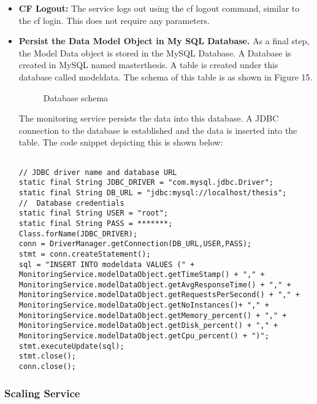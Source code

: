 \documentclass[article,type=msc,colorback,12pt,accentcolor=tud7b,table]{tudthesis}
\begin{document}
\begin{itemize}
\begin{lstlisting}
\end{lstlisting}
		
\item{\textbf{CF Logout:}} The service logs out using the cf logout command, similar to the cf login. This does not require any parameters.
		
\item{\textbf{Persist the Data Model Object in My SQL Database.}} As  a final step, the Model Data object is stored in the MySQL Database. A Database is created in MySQL named masterthesis. A table is created under this database called modeldata. The schema of this table is as shown in Figure 15.

 \begin{figure}[h]
 	\begin{center}
 		\makebox[\textwidth]{\texttt{[image: D5]}}
 	\end{center}
 	\caption{Database schema}
 \end{figure}	

The monitoring service persists the data into this database. A JDBC connection to the database is established and the data is inserted into the table. The code snippet depicting this is shown below:

\begin{lstlisting}

// JDBC driver name and database URL
static final String JDBC_DRIVER = "com.mysql.jdbc.Driver";  
static final String DB_URL = "jdbc:mysql://localhost/thesis";
//  Database credentials
static final String USER = "root";
static final String PASS = *******;
Class.forName(JDBC_DRIVER);
conn = DriverManager.getConnection(DB_URL,USER,PASS);
stmt = conn.createStatement();
sql = "INSERT INTO modeldata VALUES (" + 
MonitoringService.modelDataObject.getTimeStamp() + "," + 
MonitoringService.modelDataObject.getAvgResponseTime() + "," + 
MonitoringService.modelDataObject.getRequestsPerSecond() + "," + 
MonitoringService.modelDataObject.getNoInstances()+ "," + 
MonitoringService.modelDataObject.getMemory_percent() + "," + 
MonitoringService.modelDataObject.getDisk_percent() + "," +
MonitoringService.modelDataObject.getCpu_percent() + ")";				
stmt.executeUpdate(sql);
stmt.close();	    
conn.close();	    
\end{lstlisting}		
\end{itemize}	
\subsubsection{Scaling Service}
	
\end{document}
